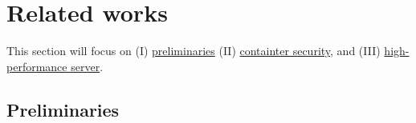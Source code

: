 \documentclass[12pt,a4paper]{article}
\begin{document}

\section{Related works}
This section will focus on (\RN{1}) \hyperlink{preliminaries}{preliminaries} (\RN{2}) \hyperlink{security}{containter security}, and (\RN{3})
\hyperlink{heigh_performance}{high-performance server}.

\subsection{Preliminaries}
\hypertarget{preliminaries}{}
\end{document}
